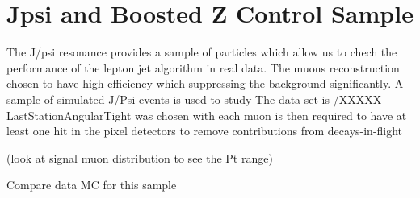 \section{Jpsi and Boosted Z Control Sample}
The J/psi resonance provides a sample of particles which allow us to chech the performance of the lepton jet algorithm in real data. The muons reconstruction chosen to have high efficiency which suppressing the background significantly. A sample of simulated J/Psi events is used to study The data set is /XXXXX
LastStationAngularTight was chosen with each muon is then required to have at least one hit in the pixel detectors to remove contributions from decays-in-flight

(look at signal muon distribution to see the Pt range)

Compare data MC for this sample 